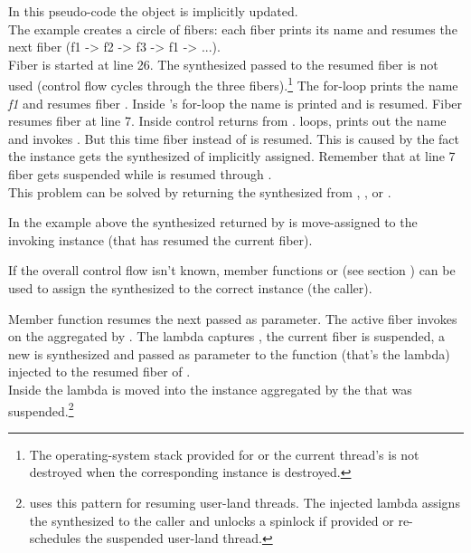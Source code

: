 In this pseudo-code the \fiber object is implicitly updated.\\
The example creates a circle of fibers: each fiber prints its name and resumes
the next fiber (f1 -> f2 -> f3 -> f1 -> ...).\\
Fiber  is started at line 26. The synthesized \fiber\xspace {} passed 
to the resumed fiber is not used (control flow cycles through the three
fibers).\footnote{The operating-system stack provided for \main or the current
thread's \entryfn\xspace is not destroyed when the corresponding \fiber instance is
destroyed.}
The for-loop prints the name \emph{f1} and resumes fiber . Inside 
's for-loop the name is printed and  is resumed. Fiber 
resumes fiber  at line 7. Inside  control returns from
.  loops, prints out the name and invokes . But
this time fiber  instead of  is resumed. This is caused by the
fact the instance  gets the synthesized \fiber of  implicitly
assigned. Remember that at line 7 fiber  gets suspended while 
is resumed through .\\

This problem can be solved by returning the synthesized \fiber from \resume,
\resumewith, \xtresume or \xtresumewith.

In the example above the synthesized \fiber returned by \resume is
move-assigned to the invoking \fiber instance (that has resumed the current
fiber).\\

\xspace\newline

If the overall control flow isn't known, member functions \resumewith
or \xtresumewith (see section ) can be used to assign the
synthesized \fiber to the correct \fiber instance (the caller).

Member function  resumes the next  passed as
parameter. The active fiber invokes\\\resumewith on the \fiber aggregated by
. The lambda captures , the current fiber is suspended, a
new \fiber is synthesized and passed as parameter  to the function
(that's the lambda) injected to the resumed fiber of .\\
Inside the lambda  is moved into the instance  aggregated by the
 that was suspended.\footnote{\bfiber\cite{bfiber} uses this 
pattern for resuming user-land threads.
The injected lambda assigns the synthesized \fiber to the caller and unlocks a
spinlock if provided or re-schedules the suspended user-land thread.}

